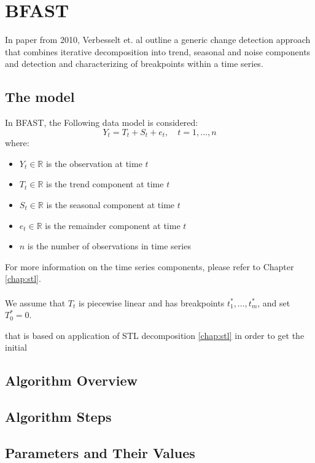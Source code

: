 \documentclass[main.tex]{subfiles}
\begin{document}
\chapter{BFAST}
\label{chap:bfast}
In paper from 2010, Verbesselt et. al \cite{bfast} outline a generic change detection approach
that combines iterative decomposition into trend, seasonal and noise components and detection
and characterizing of breakpoints within a time series. 

\section{The model}
\label{sec:bfast_the_model}
In BFAST, the Following data model is considered:
\[
Y_t = T_t + S_t + e_t, \quad t = 1,...,n
\]
where:
\begin{itemize}
\item $Y_t \in \mathbb{R}$ is the observation at time $t$
\item $T_t \in \mathbb{R}$ is the trend component at time $t$
\item $S_t \in \mathbb{R}$ is the seasonal component at time $t$
\item $e_t \in \mathbb{R}$ is the remainder component at time $t$
\item $n$ is the number of observations in time series
\end{itemize}
For more information on the time series components, please refer to Chapter \ref{chap:stl}.\\\\
We assume that $T_t$ is piecewise linear and has breakpoints $t_1^*,\hdots, t_m^*$, and set
$T_0^* = 0$. 



that is based on application of STL decomposition \ref{chap:stl} in order to get the initial





\section{Algorithm Overview}
\label{sec:bfast_algorithm_overview}
\section{Algorithm Steps}
\label{sec:algorithm_steps}
\section{Parameters and Their Values}
\label{sec:bfast_params}

\biblio
\end{document}
